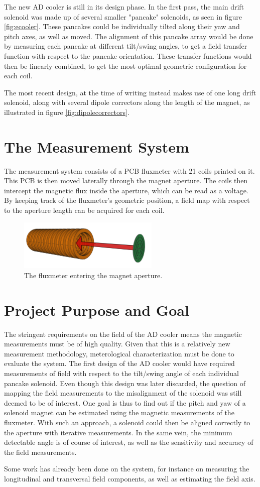 The new AD cooler is still in its design phase. In the first pass,
the main drift solenoid was made up of several smaller "pancake"
solenoids, as seen in figure \ref{fig:ecooler}. These pancakes could
be individually tilted along their yaw and pitch axes, as well as moved.
The alignment of this pancake array would be done by measuring each
pancake at different tilt/swing angles, to get a field transfer function
with respect to the pancake orientation. These transfer functions would
then be linearly combined, to get the most optimal geometric configuration
for each coil.

The most recent design, at the time of writing instead makes use of 
one long drift solenoid, along with several dipole correctors along the
length of the magnet, as illustrated in figure \ref{fig:dipolecorrectors}.

\section{The Measurement System}
The measurement system consists of a PCB fluxmeter with 21 coils printed on it.
This PCB is then moved laterally through the magnet aperture. 
The coils then intercept the magnetic flux inside the aperture,
which can be read as a voltage. By keeping track of the fluxmeter's
geometric position, a field map with respect to the aperture length
can be acquired for each coil.

\begin{figure}[!h]
    \centering
    \includegraphics[width=0.6\textwidth]{figs/pcbpath}
    \caption{The fluxmeter entering the magnet aperture.}
    \label{fig:pcbpath}
\end{figure}

\section{Project Purpose and Goal}
The stringent requirements on the field of the AD cooler means the 
magnetic measurements must be of high quality. Given that this is 
a relatively new measurement methodology, meterological characterization
must be done to evaluate the system. The first design of the AD cooler
would have required measurements of field with respect to the tilt/swing
angle of each individual pancake solenoid. Even though this design was
later discarded, the question of mapping the field measurements to 
the misalignment of the solenoid was still deemed to be of interest.
One goal is thus to find out if the pitch and yaw of a solenoid magnet 
can be estimated using the magnetic measurements of the fluxmeter.
With such an approach, a solenoid could then be aligned correctly
to the aperture with iterative measurements.
In the same vein, the minimum detectable angle is of course of interest,
as well as the sensitivity and accuracy of the field measurements. 

Some work has already been done on the system, for instance on measuring
the longitudinal and transversal field components, as well as estimating 
the field axis. \cite{inductioncoilmeas}
